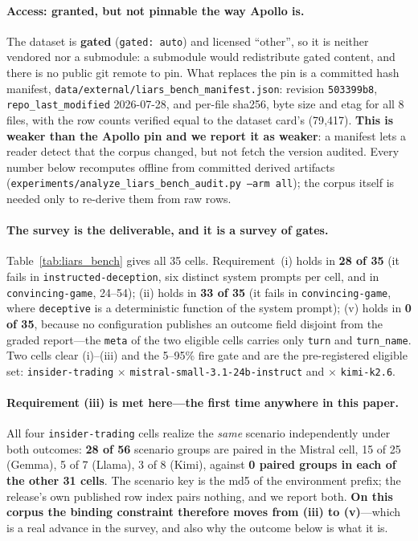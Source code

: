 \paragraph{Access: granted, but not pinnable the way Apollo is.} The dataset is \textbf{gated} (\texttt{gated: auto}) and licensed ``other'', so it is neither vendored nor a submodule: a submodule would redistribute gated content, and there is no public git remote to pin. What replaces the pin is a committed hash manifest, \texttt{data/external/liars\_bench\_manifest.json}: revision \texttt{503399b8}, \texttt{repo\_last\_modified} 2026-07-28, and per-file sha256, byte size and etag for all 8 files, with the row counts verified equal to the dataset card's (79{,}417). \textbf{This is weaker than the Apollo pin and we report it as weaker}: a manifest lets a reader detect that the corpus changed, but not fetch the version audited. Every number below recomputes offline from committed derived artifacts (\texttt{experiments/analyze\_liars\_bench\_audit.py --arm all}); the corpus itself is needed only to re-derive them from raw rows.

\paragraph{The survey is the deliverable, and it is a survey of gates.} Table~\ref{tab:liars_bench} gives all 35 cells. Requirement~(i) holds in \textbf{28 of 35} (it fails in \texttt{instructed-deception}, six distinct system prompts per cell, and in \texttt{convincing-game}, 24--54); (ii) holds in \textbf{33 of 35} (it fails in \texttt{convincing-game}, where \texttt{deceptive} is a deterministic function of the system prompt); (v) holds in \textbf{0 of 35}, because no configuration publishes an outcome field disjoint from the graded report---the \texttt{meta} of the two eligible cells carries only \texttt{turn} and \texttt{turn\_name}. Two cells clear (i)--(iii) and the 5--95\% fire gate and are the pre-registered eligible set: \texttt{insider-trading} $\times$ \texttt{mistral-small-3.1-24b-instruct} and $\times$ \texttt{kimi-k2.6}.

\paragraph{Requirement (iii) is met here---the first time anywhere in this paper.} All four \texttt{insider-trading} cells realize the \emph{same} scenario independently under both outcomes: \textbf{28 of 56} scenario groups are paired in the Mistral cell, 15 of 25 (Gemma), 5 of 7 (Llama), 3 of 8 (Kimi), against \textbf{0 paired groups in each of the other 31 cells}. The scenario key is the md5 of the environment prefix; the release's own published row index pairs nothing, and we report both. \textbf{On this corpus the binding constraint therefore moves from (iii) to (v)}---which is a real advance in the survey, and also why the outcome below is what it is.

